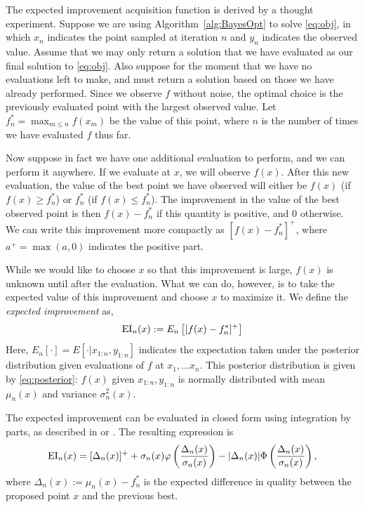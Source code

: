 \documentclass{article}
\begin{document}
The expected improvement acquisition function is derived by a thought experiment.  
Suppose we are using Algorithm~\ref{alg:BayesOpt} to solve \eqref{eq:obj}, in which $x_n$ indicates the point sampled at iteration $n$ and $y_n$ indicates the observed value.
Assume that we may only return a solution that we have evaluated as our final solution to \eqref{eq:obj}.  
Also suppose for the moment that we have no evaluations left to make, and must return a solution based on those we have already performed.
Since we observe $f$ without noise, 
the optimal choice is the previously evaluated point with the largest observed value.  Let $f^*_n = \max_{m\le n} f(x_m)$ be the value of this point, where $n$ is the number of times we have evaluated $f$ thus far.

Now suppose in fact we have one additional evaluation to perform, and we can perform it anywhere.  If we evaluate at $x$, we will observe $f(x)$.  After this new evaluation, the value of the best point we have observed will either be $f(x)$ (if $f(x) \ge f^*_n$) or $f^*_n$ (if $f(x) \le f^*_n$).  The improvement in the value of the best observed point is then $f(x) - f^*_n$ if this quantity is positive, and $0$ otherwise.  We can write this improvement more compactly as $[f(x) - f^*_n]^+$, where $a^+ = \max(a,0)$ indicates the positive part.

While we would like to choose $x$ so that this improvement is large, $f(x)$ is unknown until after the evaluation.  What we can do, however, 
is to take the expected value of this improvement and choose $x$ to maximize it.
We define the {\it expected improvement} as,
\begin{equation}
\mathrm{EI}_n(x) := E_n\left[[f(x) - f^*_n]^+\right] \label{eq:EI-theory}
\end{equation}
Here, $E_n[\cdot] = E[\cdot | x_{1:n}, y_{1:n}]$ indicates the expectation taken under the posterior distribution given evaluations of $f$ at $x_1,\ldots x_n$.
This posterior distribution is given by \eqref{eq:posterior}: $f(x)$ given $x_{1:n},y_{1:n}$ is normally distributed with mean $\mu_n(x)$ and variance $\sigma^2_n(x)$.

The expected improvement can be evaluated in closed form using integration by parts, as described in \cite{JoScWe98} or \cite{clark1961greatest}.  The resulting expression is
\begin{equation}
\mathrm{EI}_n(x) = [\Delta_n(x)]^+ + \sigma_n(x) \varphi\left(\frac{\Delta_n(x)}{\sigma_n(x)}\right) - |\Delta_n(x)|\Phi\left(\frac{\Delta_n(x)}{\sigma_n(x)}\right),
\label{eq:EI-formula}
\end{equation}
where $\Delta_n(x) := \mu_n(x) - f^*_n$ is the expected difference in quality between the proposed point $x$ and the previous best.
\end{document}
